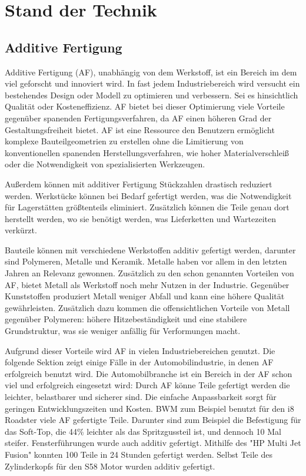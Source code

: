 \chapter{Stand der Technik}

\section{Additive Fertigung}

Additive Fertigung (AF), unabhängig von dem Werkstoff, ist ein Bereich im dem viel
geforscht und innoviert wird. In fast jedem Industriebereich wird versucht ein
bestehendes Design oder Modell zu optimieren und verbessern.
Sei es hinsichtlich Qualität oder Kosteneffizienz. AF bietet bei 
dieser Optimierung viele Vorteile gegenüber spanenden Fertigungsverfahren, da 
AF einen höheren Grad der Gestaltungsfreiheit bietet. 
AF ist eine Ressource den Benutzern ermöglicht komplexe 
Bauteilgeometrien zu erstellen ohne die Limitierung von konventionellen spanenden 
Herstellungsverfahren, wie hoher Materialverschleiß oder die Notwendigkeit von 
spezialisierten Werkzeugen. \cite{Vafadar.2021} 

Außerdem können mit additiver Fertigung Stückzahlen drastisch reduziert werden.
Werkstücke können bei Bedarf gefertigt werden, was die Notwendigkeit für Lagerstätten
größtenteils eliminiert. Zusätzlich können die Teile genau dort herstellt werden, wo 
sie benötigt werden, was Lieferketten und Wartezeiten verkürzt.

Bauteile können mit verschiedene Werkstoffen additiv gefertigt werden, 
darunter sind Polymeren, Metalle und Keramik. 
Metalle haben vor allem in den letzten Jahren 
an Relevanz gewonnen. Zusätzlich zu den schon genannten Vorteilen von AF, 
bietet Metall als Werkstoff noch mehr Nutzen in der Industrie. Gegenüber Kunststoffen
produziert Metall weniger Abfall und kann eine höhere Qualität gewährleisten.
Zusätzlich dazu kommen die offensichtlichen Vorteile von Metall gegenüber Polymeren: 
höhere Hitzebeständigkeit und eine stabilere Grundstruktur, was sie weniger anfällig 
für Verformungen macht.

Aufgrund dieser Vorteile wird AF in vielen Industriebereichen genutzt. Die folgende
Sektion zeigt einige Fälle in der Automobilindustrie, in denen AF 
erfolgreich benutzt wird.
Die Automobilbranche ist ein Bereich in der AF schon viel und erfolgreich 
eingesetzt wird:
Durch AF könne Teile gefertigt werden die leichter, belastbarer und sicherer sind. 
Die einfache Anpassbarkeit sorgt für geringen Entwicklungszeiten und Kosten. 
BWM zum Beispiel benutzt für den i8 Roadster viele AF gefertigte Teile.
Darunter sind zum Beispiel die Befestigung für das Soft-Top, die 44\% leichter als das Spritzgussteil
ist, und dennoch 10 Mal steifer. \cite{Vafadar.2021} 
Fensterführungen wurde auch additiv gefertigt. Mithilfe des "HP Multi Jet Fusion" 
konnten 100 Teile in 24 Stunden gefertigt werden. Selbst Teile des Zylinderkopfs für den 
S58 Motor wurden additiv gefertigt. \cite{Anusci.2019}

